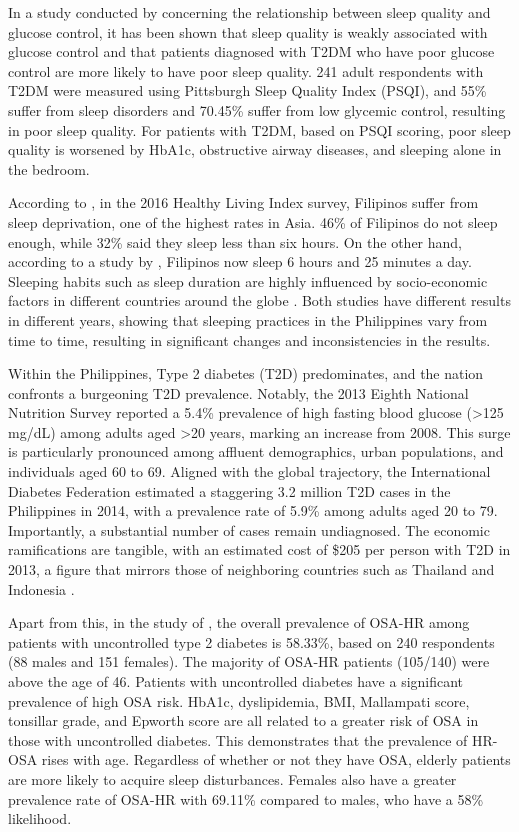 In a study conducted by \textcite{zaraspe-2017} concerning the relationship
between sleep quality and glucose control, it has been shown that sleep quality
is weakly associated with glucose control and that patients diagnosed with T2DM
who have poor glucose control are more likely to have poor sleep quality. 241
adult respondents with T2DM were measured using Pittsburgh Sleep Quality Index
(PSQI), and 55\% suffer from sleep disorders and 70.45\% suffer from low
glycemic control, resulting in poor sleep quality. For patients with T2DM, based
on PSQI scoring, poor sleep quality is worsened by HbA1c, obstructive airway
diseases, and sleeping alone in the bedroom.

According to \textcite{pelegrino-2021}, in the 2016 Healthy Living Index survey,
Filipinos suffer from sleep deprivation, one of the highest rates in Asia. 46\%
of Filipinos do not sleep enough, while 32\% said they sleep less than six
hours. On the other hand, according to a study by \textcite{singh-2020},
Filipinos now sleep 6 hours and 25 minutes a day. Sleeping habits such as sleep
duration are highly influenced by socio-economic factors in different countries
around the globe \parencite{lajunen-2023}. Both studies have different results
in different years, showing that sleeping practices in the Philippines vary from
time to time, resulting in significant changes and inconsistencies in the
results.

Within the Philippines, Type 2 diabetes (T2D) predominates, and the nation
confronts a burgeoning T2D prevalence. Notably, the 2013 Eighth National
Nutrition Survey reported a 5.4\% prevalence of high fasting blood glucose (>125
mg/dL) among adults aged >20 years, marking an increase from 2008. This surge is
particularly pronounced among affluent demographics, urban populations, and
individuals aged 60 to 69. Aligned with the global trajectory, the International
Diabetes Federation estimated a staggering 3.2 million T2D cases in the
Philippines in 2014, with a prevalence rate of 5.9\% among adults aged 20 to 79.
Importantly, a substantial number of cases remain undiagnosed. The economic
ramifications are tangible, with an estimated cost of
\$205 per person with T2D in 2013, a figure that mirrors those of neighboring
countries such as Thailand and Indonesia \parencite{tan-2016}.

Apart from this, in the study of \textcite{de-leon-2021}, the overall prevalence
of OSA-HR among patients with uncontrolled type 2 diabetes is 58.33\%, based on
240 respondents (88 males and 151 females). The majority of OSA-HR patients
(105/140) were above the age of 46. Patients with uncontrolled diabetes have a
significant prevalence of high OSA risk. HbA1c, dyslipidemia, BMI, Mallampati
score, tonsillar grade, and Epworth score are all related to a greater risk of
OSA in those with uncontrolled diabetes. This demonstrates that the prevalence
of HR-OSA rises with age. Regardless of whether or not they have OSA, elderly
patients are more likely to acquire sleep disturbances. Females also have a
greater prevalence rate of OSA-HR with 69.11\% compared to males, who have a
58\% likelihood.

